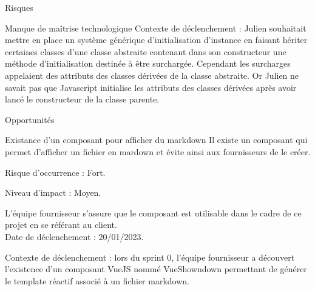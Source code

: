 \documentclass[]{article}
\begin{document}
{\begin{section}{Risques}
\begin{subsection}{Manque de maîtrise technologique}
     Contexte de déclenchement : Julien souhaitait mettre en place un système générique d'initialisation d'instance en faisant hériter certaines classes d'une classe abstraite contenant dans son constructeur une méthode d'initialisation destinée à être surchargée. Cependant les surcharges appelaient des attributs des classes dérivées de la classe abstraite. Or Julien ne savait pas que Javascript initialise les attributs des classes dérivées après avoir lancé le constructeur de la classe parente.
 \end{subsection}
\end{section}

\begin{section}{Opportunités}
 \begin{subsection}{Existance d'un composant pour afficher du markdown}
     Il existe un composant qui permet d'afficher un fichier en mardown et évite ainsi aux fournisseurs de le créer.

     Risque d’occurrence : Fort.

     Niveau d’impact : Moyen.

     L'équipe fournisseur s'assure que le composant est utilisable dans le cadre de ce projet en se référant au client.
     \\[5mm]
     Date de déclenchement : 20/01/2023.

     Contexte de déclenchement : lors du sprint 0, l'équipe fournisseur a découvert l'existence d'un composant VueJS nommé VueShowndown permettant de générer le template réactif associé à un fichier markdown.
 \end{subsection}
\end{section}
}
\end{document}
